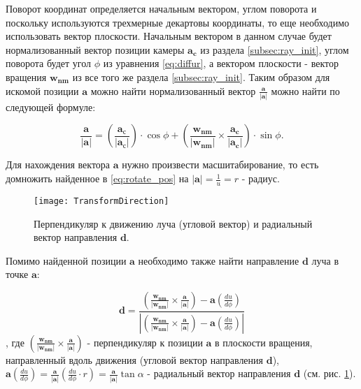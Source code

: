 Поворот координат определяется начальным вектором, углом поворота и поскольку используются трехмерные декартовы координаты, то еще необходимо использовать вектор плоскости. Начальным вектором в данном случае будет нормализованный вектор позиции камеры $\mathbf{a_c}$ из раздела \ref{subsec:ray_init}, углом поворота будет угол $\phi$ из уравнения \eqref{eq:diffur}, а вектором плоскости - вектор вращения $\mathbf{w_{nm}}$ из все того же раздела \ref{subsec:ray_init}. Таким образом для искомой позиции $\mathbf{a}$ можно найти нормализованный вектор $\frac{\mathbf{a}}{\left|\mathbf{a}\right|}$ можно найти по следующей формуле:

\begin{equation}
\label{eq:rotate_pos}
    \frac{\mathbf{a}}{\left|\mathbf{a}\right|} = \left( \frac{\mathbf{a_{с}}}{\left|\mathbf{a_{с}}\right|} \right) \cdot \cos{\phi} + \left(\frac{\mathbf{w_{nm}}}{\left|\mathbf{w_{nm}}\right|} \times \frac{\mathbf{a_c}}{\left|\mathbf{a_c}\right|} \right) \cdot \sin{\phi}.
\end{equation}

Для нахождения вектора $\mathbf{a}$ нужно произвести масшитабирование, то есть домножить найденное в \eqref{eq:rotate_pos} на $\left|\mathbf{a}\right| = \frac{1}{u} = r$ - радиус.

\begin{figure}[h]
    \centering
    \texttt{[image: TransformDirection]}
    \caption{Перпендикуляр к движению луча (угловой вектор) и радиальный вектор направления $\mathbf{d}$.}
    \label{fig:transform_direction}
\end{figure}

Помимо найденной позиции $\mathbf{a}$ необходимо также найти направление $\mathbf{d}$ луча в точке $\mathbf{a}$:

\begin{equation}
\label{eq:rotate_dir}
    \mathbf{d} = \frac{\left(\frac{\mathbf{w_{nm}}}{\left|\mathbf{w_{nm}}\right|} \times \frac{\mathbf{a}}{\left|\mathbf{a}\right|}\right) - \mathbf{a}\left(\frac{du}{d\phi}\right)}{\left| \left(\frac{\mathbf{w_{nm}}}{\left|\mathbf{w_{nm}}\right|} \times \frac{\mathbf{a}}{\left|\mathbf{a}\right|}\right) - \mathbf{a}\left(\frac{du}{d\phi}\right) \right|}
\end{equation}
, где $\left(\frac{\mathbf{w_{nm}}}{\left|\mathbf{w_{nm}}\right|} \times \frac{\mathbf{a}}{\left|\mathbf{a}\right|}\right)$ - перпендикуляр к позиции $\mathbf{a}$ в плоскости вращения, направленный вдоль движения (угловой вектор направления $\mathbf{d}$), $\mathbf{a}\left(\frac{du}{d\phi}\right) = \frac{\mathbf{a}}{\left|\mathbf{a}\right|}\left(\frac{du}{d\phi} \cdot r\right) = \frac{\mathbf{a}}{\left|\mathbf{a}\right|} \tan{\alpha}$ - радиальный вектор направления $\mathbf{d}$ (см. рис. \ref{fig:transform_direction}). 

